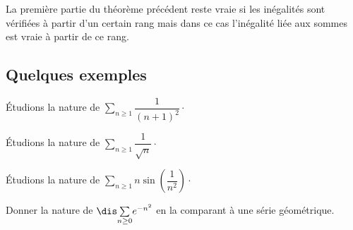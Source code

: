 \documentclass[a4paper,10pt]{report}
\newcommand{\Sum}[2]{\ensuremath{\textstyle{\sum\limits_{#1}^{#2}}}}
\begin{document}
\begin{rem} La première partie du théorème précédent reste vraie si les inégalités sont vérifiées à partir d'un certain rang mais dans ce cas l'inégalité liée aux sommes est vraie à partir de ce rang.
\end{rem}


\subsection{Quelques exemples}

\newpage
\begin{exems}
\item Étudions la nature de $\Sum{n \geq 1}{} \dfrac{1}{(n+1)^2}\cdot$

\vspace{3cm}
\item Étudions la nature de $\Sum{n \geq 1}{} \dfrac{1}{\sqrt{n}} \cdot$

\vspace{3cm}
%
\item Étudions la nature de $\Sum{n \geq 1}{} n \sin \left(\dfrac{1}{n^2}\right) \cdot$

\vspace{3cm}
%
\end{exems}

\begin{exa} Donner la nature de $ \dis \Sum{n \geq 0}{}  e^{-n^2}$ en la comparant à une série géométrique.
\end{exa}
\end{document}
